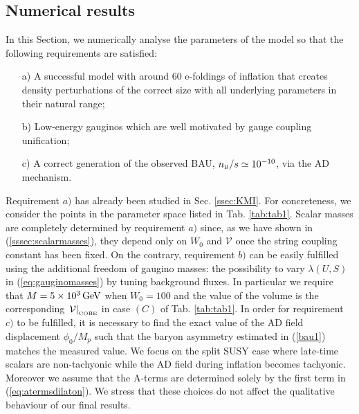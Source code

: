 \documentclass[11pt,a4paper]{article}
\def\B{{\scriptscriptstyle \rm B}}
\newcommand\vo{{\mathcal{V}}}
\begin{document}
\subsection{Numerical results}
\label{sssec:numericalresults}

In this Section, we numerically analyse the parameters of the model so that the following requirements are satisfied: 
\begin{itemize}
\item[a)] A successful model with around $60$ e-foldings of inflation that creates density perturbations of the correct size with
all underlying parameters in their natural range;

\item[b)] Low-energy gauginos which are well motivated by gauge coupling unification;

\item[c)] A correct generation of the observed BAU, $n_\B/s \simeq 10^{-10}$, via the AD mechanism.
\end{itemize}

Requirement $a)$ has already been studied in Sec. \ref{ssec:KMI}. For concreteness, we consider the points in the parameter space listed in Tab. \ref{tab:tab1}. Scalar masses are completely determined by requirement $a)$ since, as we have shown in (\ref{sssec:scalarmasses}), they depend only on $W_0$ and $\vo$ once the string coupling constant has been fixed. On the contrary, requirement $b)$ can be easily fulfilled using the additional freedom of gaugino masses: the possibility to vary $\lambda(U,S)$ in (\ref{eq:gauginomasses}) by tuning background fluxes. In particular we require that $M = 5 \times 10^3 \, \rm GeV$ when $W_0 = 100$ and the value of the volume is the corresponding $\left.\vo\right|_{\scriptscriptstyle \rm COBE}$ in case $(C)$ of Tab. \ref{tab:tab1}. In order for requirement $c)$ to be fulfilled, it is necessary to find the exact value of the AD field displacement $\phi_0/M_p$ such that the baryon asymmetry estimated in (\ref{bau1}) matches the measured value. We focus on the split SUSY case where late-time scalars are non-tachyonic while the AD field during inflation becomes tachyonic. Moreover we assume that the A-terms are determined solely by the first term in (\ref{eq:atermsdilaton}). We stress that these choices do not affect the qualitative behaviour of our final results. 
\end{document}
